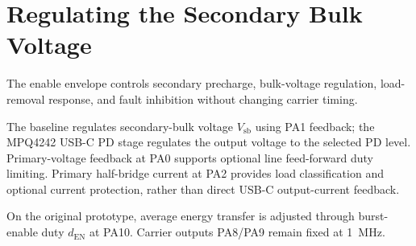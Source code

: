 \section{Regulating the Secondary Bulk Voltage}
\label{sec:ctrl-objectives}

The enable envelope controls secondary precharge, bulk-voltage regulation, load-removal response, and fault inhibition without changing carrier timing.

The baseline regulates secondary-bulk voltage \(V_{\mathrm{sb}}\) using PA1 feedback; the MPQ4242 USB-C PD stage regulates the output voltage to the selected PD level. Primary-voltage feedback at PA0 supports optional line feed-forward duty limiting. Primary half-bridge current at PA2 provides load classification and optional current protection, rather than direct USB-C output-current feedback.

On the original prototype, average energy transfer is adjusted through burst-enable duty \(d_{\mathrm{EN}}\) at PA10. Carrier outputs PA8/PA9 remain fixed at \SI{1}{\mega\hertz}.
